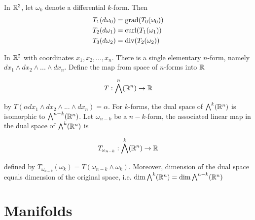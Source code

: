 \documentclass{article}
\begin{document}
\begin{theorem}
    In $\mathbb{R}^3$, let $\omega_k$ denote a differential $k$-form. Then
    \begin{align*}
        T_1(d\omega_0)  &= \operatorname{grad}(T_0(\omega_0)) \\
        T_2(d\omega_1)  &= \operatorname{curl}(T_1(\omega_1)) \\
        T_3(d\omega_2)  &= \operatorname{div}(T_2(\omega_2)) \\
    \end{align*}
\end{theorem}

In $\mathbb{R}^2$ with coordinates $x_1, x_2, ..., x_n$. There is a single elementary $n$-form, namely $dx_1 \wedge dx_2 \wedge ... \wedge dx_n$. Define the map from space of $n$-forms into $\mathbb{R}$

$$
    T: \bigwedge^n (\mathbb{R}^n) \to \mathbb{R}
$$

by $T(\alpha dx_1 \wedge dx_2 \wedge ... \wedge dx_n) = \alpha$. For $k$-forms, the dual space of $\bigwedge^k(\mathbb{R}^n)$ is isomorphic to $\bigwedge^{n-k}(\mathbb{R}^n)$. Let $\omega_{n-k}$ be a $n-k$-form, the associated linear map in the dual space of $\bigwedge^k(\mathbb{R}^n)$ is

$$
    T_{\omega_{n-k}}: \bigwedge^{k}(\mathbb{R}^n) \to \mathbb{R}
$$

defined by $T_{\omega_{n-k}} (\omega_k) = T(\omega_{n-k} \wedge \omega_k)$. Moreover, dimension of the dual space equals dimension of the original space, i.e. $\dim \bigwedge^{k}(\mathbb{R}^n)= \dim \bigwedge^{n-k}(\mathbb{R}^n)$

\section{Manifolds}
\end{document}
